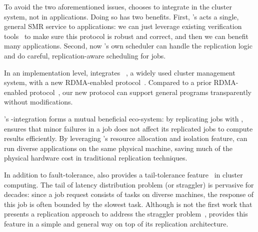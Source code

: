 To avoid the two aforementioned issues, \xxx chooses to integrate \paxos in the 
cluster system, not in applications. Doing so has two benefits. First, \xxx's 
\paxos acts a single, general SMR service to applications: we can just 
leverage existing verification tools~\cite{modist:nsdi09,demeter:sosp11} to 
make sure this \paxos protocol is robust and correct, and then we can benefit 
many applications. Second, now \xxx's own scheduler can handle the 
replication logic and do careful, replication-aware scheduling for jobs.


In an implementation level, \xxx integrates \mesos~\cite{mesos:nsdi11}, a widely 
used cluster management system, with a new RDMA-enabled \paxos 
protocol~\cite{falcon:github}. Compared to a prior RDMA-enabled \paxos 
protocol~\cite{dare:hpdc15}, our new protocol can support general programs 
transparently without modifications.

\xxx's \mesos-\paxos integration forms a mutual beneficial 
eco-system: by replicating jobs with \paxos, 
\xxx ensures that minor failures in a job does not affect its replicated jobs to 
compute results efficiently. By leveraging \mesos's resource allocation and 
isolation feature, \xxx can run diverse applications on the same physical 
machine, saving much of the physical hardware cost in traditional replication 
techniques.




In addition to fault-tolerance, \xxx also provides a tail-tolerance 
feature~\cite{tail:cacm13} in cluster computing. The tail of latency 
distribution problem (or straggler) is pervasive for decades: since a 
job request consists of tasks on diverse machines, the response of this 
job is often bounded by the slowest task. Although \xxx is not the first work 
that presents a replication approach to address the straggler 
problem~\cite{dolly:nsdi13}, \xxx provides this feature in a simple and general 
way on top of its \paxos replication architecture.

